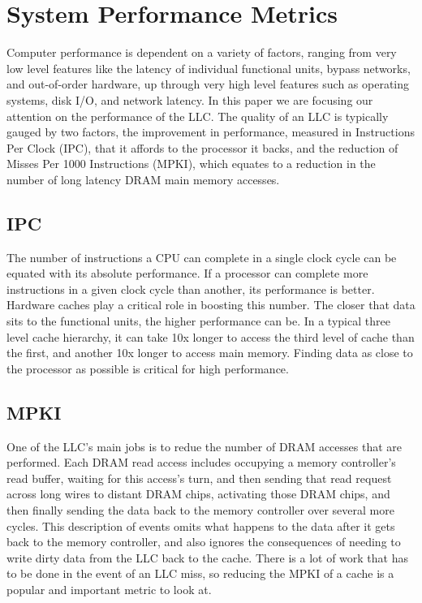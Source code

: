 \section{System Performance Metrics}

Computer performance is dependent on a variety of factors, ranging
from very low level features like the latency of individual functional
units, bypass networks,
and out-of-order hardware, up through very high level features such as
operating systems, disk I/O, and network latency.  In this paper we
are focusing our attention on the performance of the LLC.  The quality
of an LLC is typically gauged by two factors, the improvement in
performance, measured in Instructions Per Clock (IPC),
that it affords to the processor it backs, and the reduction of Misses
Per
1000 Instructions (MPKI), which equates to a reduction in the
number of long latency DRAM main memory accesses.

\subsection{IPC}

The number of instructions a CPU can complete in a single clock cycle
can be equated with its absolute performance.  If a processor can
complete more instructions in a given clock cycle than another,
its performance is better.  Hardware caches play a critical role in
boosting this number.  The closer that data sits to the functional
units, the higher performance can be.  In a typical three level cache
hierarchy, it can take 10x longer to access the third level of
cache than the first, and another 10x longer to access main memory.
Finding data as close to the processor as possible is critical for
high performance.

\subsection{MPKI}

One of the LLC's main jobs is to redue the number of DRAM accesses
that are
performed.  Each DRAM read access includes occupying a memory
controller's read buffer, waiting for this access's turn, and then
sending that read request across long wires to distant DRAM chips,
activating those DRAM chips, and then finally sending the data back to
the memory controller over several more cycles.  This description of
events omits what happens to the data after it gets back to the memory
controller, and also ignores the consequences of needing to write
dirty data from the LLC back to the cache.  There is a lot of work
that has to be done in the event of an LLC miss, so reducing the MPKI
of a cache is a popular and important metric to look at.


